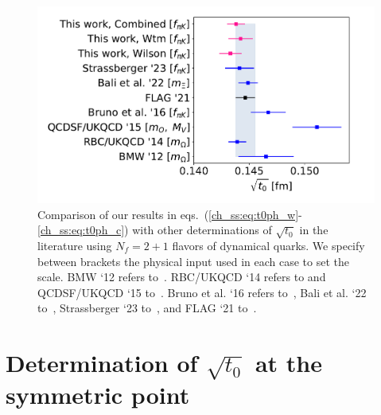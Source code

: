 \begin{figure}
    \centering
    \includegraphics[width=1.\textwidth]{./cap5/figs/t0_compar.pdf}
    \caption{Comparison of our results in eqs.~(\ref{ch_ss:eq:t0ph_w}-\ref{ch_ss:eq:t0ph_c}) with other determinations of $\sqrt{t_0}$ in the literature using $N_f=2+1$ flavors of dynamical quarks. We specify between brackets the physical input used in each case to set the scale. BMW `12 refers to~\citep{BMW:2012hcm}. RBC/UKQCD `14 refers to \citep{UK14} and QCDSF/UKQCD `15 to~\citep{UK15}. Bruno et al. `16 refers to~\citep{Bruno:2016plf}, Bali et al. `22 to~\citep{RQCD_scale}, Strassberger `23 to~\citep{Strassberger:2023xnj}, and FLAG `21 to~\citep{FlavourLatticeAveragingGroupFLAG:2021npn}.}
    \label{ch_ss:fig:t0_compar}
\end{figure}

\section{Determination of $\sqrt{t_0}$ at the symmetric point}

